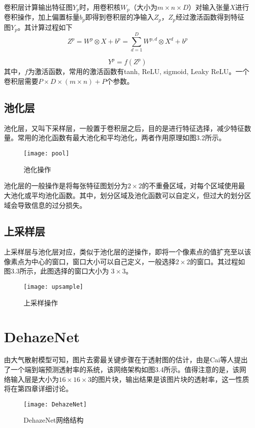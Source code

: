 \documentclass[a4paper, 12pt, oneside]{report}
\begin{document}
{卷积层计算输出特征图$Y_p$时，用卷积核$W_p$（大小为$m \times n \times D$）对输入张量$X$进行卷积操作，加上偏置标量$b_p$即得到卷积层的净输入$Z_p$，$Z_p$经过激活函数得到特征图$Y_p$。其计算过程如下
\begin{equation}
Z^p = W^p \otimes X + b^p = \sum_{d = 1}^D W^{p, d} \otimes X^d + b^p
\end{equation}

\begin{equation}
Y^p = f(Z^p)
\end{equation}
其中，$f$为激活函数，常用的激活函数有tanh, ReLU, sigmoid, Leaky ReLU。一个卷积层需要$P \times D \times (m \times n) + P$个参数。

\subsection{池化层\quad}
池化层，又叫下采样层，一般置于卷积层之后，目的是进行特征选择，减少特征数量。常用的池化函数有最大池化和平均池化，两者作用原理如图3.2所示。
\begin{figure}[h]
\centering
\texttt{[image: pool]}
\caption{池化操作}
\end{figure}
池化层的一般操作是将每张特征图划分为$2\times 2$的不重叠区域，对每个区域使用最大池化或平均池化函数。其中，划分区域及池化函数可以自定义，但过大的划分区域会导致信息的过分损失。

\subsection{上采样层\quad}
上采样层与池化层对应，类似于池化层的逆操作，即将一个像素点的值扩充至以该像素点为中心的窗口，窗口大小可以自己定义，一般选择$2\times 2$的窗口。其过程如图3.3所示，此图选择的窗口大小为 $3 \times 3$。
\begin{figure}[h]
\centering
\texttt{[image: upsample]}
\caption{上采样操作}
\end{figure}

\section{DehazeNet\quad}
由大气散射模型可知，图片去雾最关键步骤在于透射图的估计，由是Cai\cite{ref16}等人提出了一个端到端预测透射率的系统，该网络架构如图3.4所示。值得注意的是，该网络输入层是大小为$16 \times 16 \times 3$的图片块，输出结果是该图片块的透射率，这一性质将在第四章详细讨论。
\begin{figure}[h]
\centering
\texttt{[image: DehazeNet]}
\caption{DehazeNet网络结构}
\end{figure}

}
\end{document}
